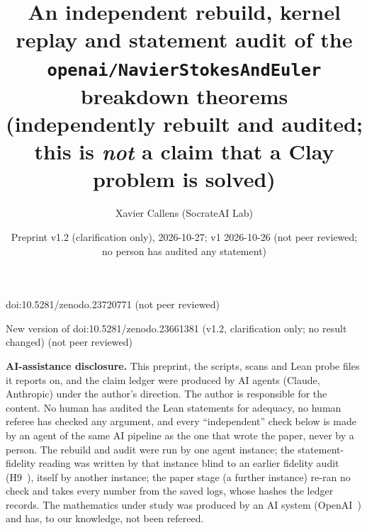 \documentclass[10pt]{article}
\title{An independent rebuild, kernel replay and statement audit of the\\
\texttt{openai/NavierStokesAndEuler} breakdown theorems\\[2pt]
{\large (independently rebuilt and audited; this is \emph{not} a claim that a Clay problem is solved)}}
\author{Xavier Callens (SocrateAI Lab)}
\date{Preprint v1.2 (clarification only), 2026-10-27; v1 2026-10-26 \quad (not peer reviewed; no person has audited any statement)}
\renewcommand{\_}{\textunderscore\allowbreak}
\begin{document}
\maketitle
\begin{center}\small doi:10.5281/zenodo.23720771 \quad (not peer reviewed)\end{center}

\begin{center}\small New version of doi:10.5281/zenodo.23661381 (v1.2, clarification only; no result changed) \quad (not peer reviewed)\end{center}


\noindent\textbf{AI-assistance disclosure.} This preprint, the scripts, scans and Lean probe files it reports on, and the claim ledger were
produced by AI agents (Claude, Anthropic) under the author's direction. The author is responsible for the content. No human has audited the
Lean statements for adequacy, no human referee has checked any argument, and every ``independent'' check below is made by an agent of the same AI
pipeline as the one that wrote the paper, never by a person. The rebuild and audit were run by one agent instance; the statement-fidelity
reading was written by that instance blind to an earlier fidelity audit (H9~\cite{h9}), itself by another instance; the paper stage (a further
instance) re-ran no check and takes every number from the saved logs, whose hashes the ledger records. The mathematics under study was produced
by an AI system (OpenAI~\cite{corpus}) and has, to our knowledge, not been refereed.
\end{document}
